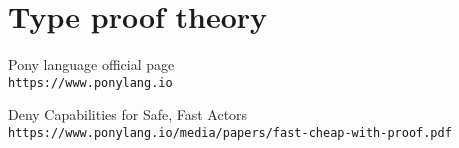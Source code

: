 \documentclass{article}
\begin{document}
\section{Type proof theory}

\begin{thebibliography}{9}
Pony language official page
\\\texttt{https://www.ponylang.io}

Deny Capabilities for Safe, Fast Actors
\\\texttt{https://www.ponylang.io/media/papers/fast-cheap-with-proof.pdf}
	
\end{thebibliography}
\end{document}
